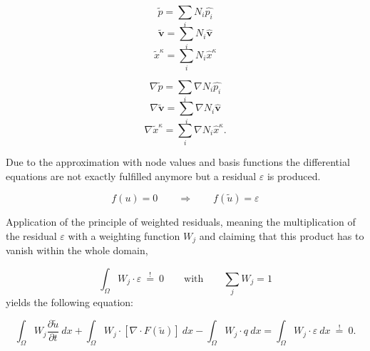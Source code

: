 \begin{minipage}[b]{0.47\textwidth}
\begin{equation}
\label{eq:p}
	\tilde p = \sum_i N_i \hat{p_i}
\end{equation}
\begin{equation}
\label{eq:v}
	\tilde{\mathbf v} = \sum_i N_i \hat{\mathbf v}
\end{equation}
\begin{equation}
\label{eq:x}
	\tilde x^\kappa  = \sum_i N_i \hat x^\kappa
\end{equation}
\end{minipage}
\hfill
\begin{minipage}[b]{0.47\textwidth}
\begin{equation}
\label{eq:dp}
	\nabla \tilde p = \sum_i \nabla N_i \hat{p_i}
\end{equation}
\begin{equation}
\label{eq:dv}
	\nabla \tilde{\mathbf v} = \sum_i \nabla N_i \hat{\mathbf v}
\end{equation}
\begin{equation}
\label{eq:dx}
	\nabla \tilde x^\kappa  = \sum_i \nabla N_i \hat x^\kappa .
\end{equation}
\end{minipage}

Due to the approximation with node values and basis functions the differential
equations are not exactly fulfilled anymore but a residual $\varepsilon$ is produced.

\begin{equation}
	f(u) = 0  \qquad \Rightarrow \qquad f(\tilde u) = \varepsilon
\end{equation}

Application of the principle of weighted residuals, meaning the multiplication
of the residual $\varepsilon$ with a weighting function $W_j$  and claiming that
this product has to vanish within the whole domain,

\begin{equation}
	\int_\Omega W_j \cdot \varepsilon \: \overset {!}{=} \: 0 \qquad \textrm{with} \qquad \sum_j W_j =1
\end{equation}
yields the following equation:

\begin{equation}
	\int_\Omega W_j \frac{\partial \tilde u}{\partial t} \: dx + \int_\Omega W_j
	\cdot \left[ \nabla \cdot F(\tilde u) \right]  \: dx - \int_\Omega W_j
	\cdot q \: dx = \int_\Omega W_j \cdot \varepsilon \: dx \: \overset {!}{=} \: 0 .
\end{equation}

